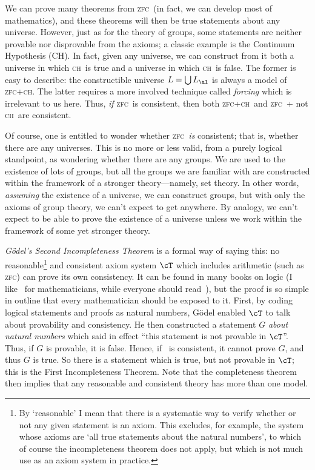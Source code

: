 \documentclass{amsart}
\def\zfc{\textsc{zfc}}
\def\ch{\textsc{ch}}
\begin{document}
We can prove many theorems from \zfc\ (in fact, we can develop most of
mathematics), and these theorems will then be true statements about
any universe.  However, just as for the theory of groups, some
statements are neither provable nor disprovable from the axioms; a
classic example is the Continuum Hypothesis (CH).  In fact, given any
universe, we can construct from it both a universe in which \ch\ is
true and a universe in which \ch\ is false.  The former is easy to
describe: the constructible universe $L=\bigcup L_\al$ is always a
model of \zfc+\ch.  The latter requires a more involved technique
called \emph{forcing} which is irrelevant to us here.  Thus, \emph{if}
\zfc\ is consistent, then both \zfc+\ch\ and \zfc\ + not \ch\ are
consistent.

Of course, one is entitled to wonder whether \zfc\ \emph{is} consistent;
that is, whether there are any universes.  This is no more or less
valid, from a purely logical standpoint, as wondering whether there
are any groups.  We are used to the existence of lots of groups, but
all the groups we are familiar with are constructed within the
framework of a stronger theory---namely, set theory.  In other words,
\emph{assuming} the existence of a universe, we can construct groups,
but with only the axioms of group theory, we can't expect to get
anywhere.  By analogy, we can't expect to be able to prove the
existence of a universe unless we work within the framework of some
yet stronger theory.

\emph{G\"odel's Second Incompleteness Theorem} is a formal way of
saying this: no reasonable\footnote{By `reasonable' I mean that there
  is a systematic way to verify whether or not any given statement is
  an axiom.  This excludes, for example, the system whose axioms are
  `all true statements about the natural numbers', to which of course
  the incompleteness theorem does not apply, but which is not much use
  as an axiom system in practice.} and consistent axiom system $\cT$
which includes arithmetic (such as \zfc) can prove its own
consistency.  It can be found in many books on logic (I
like~\cite{cl:logic} for mathematicians, while
everyone should read~\cite{geb}), but the proof is so simple in
outline that every mathematician should be exposed to it.  First, by
coding logical statements and proofs as natural numbers, G\"odel
enabled $\cT$ to talk about provability and consistency.  He then
constructed a statement $G$ \emph{about natural numbers} which said in
effect ``this statement is not provable in $\cT$''.  Thus, if $G$ is
provable, it is false.  Hence, if \cT\ is consistent, it cannot prove
$G$, and thus $G$ is true.  So there is a statement which is true, but
not provable in $\cT$; this is the First Incompleteness Theorem.  Note
that the completeness theorem then implies that any reasonable and
consistent theory has more than one model.
\end{document}
